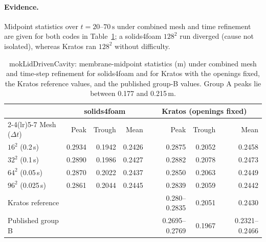 \paragraph{Evidence.}
Midpoint statistics over $t = 20$--$70\,\mathrm{s}$ under combined mesh and time refinement are given for both codes in Table~\ref{tab:mok}; a solids4foam $128^2$ run diverged (cause not isolated), whereas Kratos ran $128^2$ without difficulty.

\begin{table}[htbp]
	\centering
	\small
	\setlength{\tabcolsep}{5pt}
	\caption{mokLidDrivenCavity: membrane-midpoint statistics (m) under combined mesh and time-step refinement for solids4foam and for Kratos with the openings fixed, the Kratos reference values, and the published group-B values. Group A peaks lie between 0.177 and 0.215\,m.}
	\label{tab:mok}
	\begin{tabular}{lrrrrrr}
		\toprule
		& \multicolumn{3}{c}{solids4foam} & \multicolumn{3}{c}{Kratos (openings fixed)} \\
		\cmidrule(lr){2-4}\cmidrule(lr){5-7}
		Mesh ($\Delta t$) & Peak & Trough & Mean & Peak & Trough & Mean \\
		\midrule
		$16^2$ (0.2\,s) & 0.2934 & 0.1942 & 0.2426 & 0.2875 & 0.2052 & 0.2458 \\
		$32^2$ (0.1\,s) & 0.2890 & 0.1986 & 0.2427 & 0.2882 & 0.2078 & 0.2473 \\
		$64^2$ (0.05\,s) & 0.2870 & 0.2022 & 0.2437 & 0.2850 & 0.2063 & 0.2449 \\
		$96^2$ (0.025\,s) & 0.2861 & 0.2044 & 0.2445 & 0.2839 & 0.2059 & 0.2442 \\
		\midrule
		Kratos reference & & & & 0.280--0.2835 & 0.2051 & 0.2430 \\
		Published group B & & & & 0.2695--0.2769 & 0.1967 & 0.2321--0.2466 \\
		\bottomrule
	\end{tabular}
\end{table}

